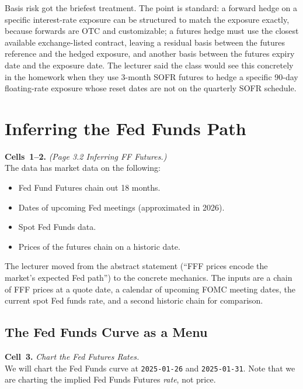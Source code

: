 Basis risk got the briefest treatment. The point is standard: a forward
hedge on a specific interest-rate exposure can be structured to match the
exposure exactly, because forwards are OTC and customizable; a futures
hedge must use the closest available exchange-listed contract, leaving a
residual basis between the futures reference and the hedged exposure, and
another basis between the futures expiry date and the exposure date. The
lecturer said the class would see this concretely in the homework when
they use 3-month SOFR futures to hedge a specific 90-day floating-rate
exposure whose reset dates are not on the quarterly SOFR schedule.

\section{Inferring the Fed Funds Path}\label{L3-sec:infer}

\begin{keyblock}
\textbf{Cells~1--2.} \emph{(Page 3.2 \textperiodcentered{} Inferring FF
Futures.)}\\
The data has market data on the following:
\begin{itemize}
  \item Fed Fund Futures chain out 18 months.
  \item Dates of upcoming Fed meetings (approximated in 2026).
  \item Spot Fed Funds data.
  \item Prices of the futures chain on a historic date.
\end{itemize}
\end{keyblock}

The lecturer moved from the abstract statement (``FFF prices encode the
market's expected Fed path'') to the concrete mechanics. The inputs are a
chain of FFF prices at a quote date, a calendar of upcoming FOMC meeting
dates, the current spot Fed funds rate, and a second historic chain for
comparison.

\subsection{The Fed Funds Curve as a Menu}\label{L3-sec:infer-menu}

\begin{keyblock}
\textbf{Cell~3.} \emph{Chart the Fed Futures Rates.}\\
We will chart the Fed Funds curve at \texttt{2025-01-26} and
\texttt{2025-01-31}.
Note that we are charting the implied Fed Funds Futures \emph{rate}, not
price.
\end{keyblock}

